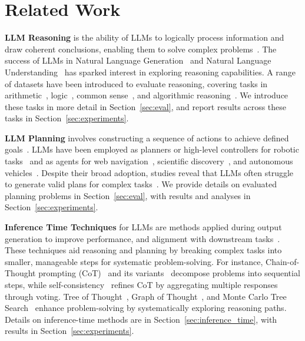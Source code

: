 \section{Related Work}
\label{sec:related}
\textbf{LLM Reasoning} is the ability of LLMs to logically process information and draw coherent conclusions, enabling them to solve complex problems~\citep{PrOntoQA}. The success of LLMs in Natural Language Generation~\citep{radford2018improving} and Natural Language Understanding~\citep{vaswani2017attention, devlin2019bert} has sparked interest in exploring reasoning capabilities. A range of datasets have been introduced to evaluate reasoning, covering tasks in arithmetic~\citep{aqua,cobbe2021gsm8k}, logic~\citep{arc_agi,wang2022lsat}, common sense~\citep{yang2018hotpotqa, geva2021did}, and algorithmic reasoning~\citep{yao2024tree}. We introduce these tasks in more detail in 
Section~\ref{sec:eval}, and report results across these tasks in Section~\ref{sec:experiments}.


\textbf{LLM Planning} involves constructing a sequence of actions to achieve defined goals~\citep{valmeekam2023planning, zheng2024natural}. LLMs have been employed as planners or high-level controllers for robotic tasks~\cite{liu2023llmp, huang2022language} and as agents for web navigation~\citep{deng2024mind2web}, scientific discovery~\citep{wang2024survey}, and autonomous vehicles~\citep{yang2023llm4drive}. Despite their broad adoption, studies reveal that LLMs often struggle to generate valid plans for complex  tasks~\citep{kambhampatiposition, xie2024travelplanner}. We provide details on evaluated planning problems in Section~\ref{sec:eval}, with results and analyses in Section~\ref{sec:experiments}.

\textbf{Inference Time Techniques} %
for LLMs are methods applied during output generation to improve performance, and alignment with downstream tasks~\citep{welleck2024from}. These techniques aid reasoning and planning by breaking complex tasks into smaller, manageable steps for systematic problem-solving. For instance, Chain-of-Thought prompting (CoT)~\citep{wei2022chain} and its variants~\citep{zhou2023leasttomost, kojima2022large} decompose problems into sequential steps, while self-consistency~\citep{wang2023selfconsistency} refines CoT by aggregating multiple responses through voting. Tree of Thought~\citep{yao2024tree}, Graph of Thought~\citep{besta2024graph}, and Monte Carlo Tree Search~\citep{rap,lats} enhance problem-solving by systematically exploring reasoning paths. Details on inference-time methods are in Section~\ref{sec:inference_time}, with results in Section~\ref{sec:experiments}.